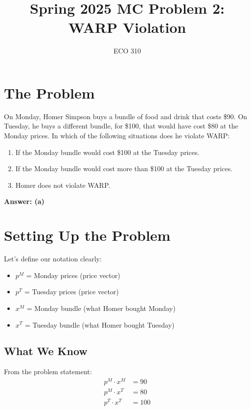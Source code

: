 \documentclass[11pt]{article}
\title{Spring 2025 MC Problem 2: WARP Violation}
\author{ECO 310}
\date{}
\begin{document}
\maketitle

\section{The Problem}

On Monday, Homer Simpson buys a bundle of food and drink that costs \$90. On Tuesday, he buys a different bundle, for \$100, that would have cost \$80 at the Monday prices. In which of the following situations does he violate WARP:

\begin{enumerate}
    \item[(a)] If the Monday bundle would cost \$100 at the Tuesday prices.
    \item[(b)] If the Monday bundle would cost more than \$100 at the Tuesday prices.
    \item[(c)] Homer does not violate WARP.
\end{enumerate}

\textbf{Answer: (a)}

\section{Setting Up the Problem}

Let's define our notation clearly:
\begin{itemize}
    \item $p^M$ = Monday prices (price vector)
    \item $p^T$ = Tuesday prices (price vector)
    \item $x^M$ = Monday bundle (what Homer bought Monday)
    \item $x^T$ = Tuesday bundle (what Homer bought Tuesday)
\end{itemize}

\subsection{What We Know}

From the problem statement:
\begin{align}
p^M \cdot x^M &= 90 \tag{Monday bundle cost on Monday} \\
p^M \cdot x^T &= 80 \tag{Tuesday bundle cost at Monday prices} \\
p^T \cdot x^T &= 100 \tag{Tuesday bundle cost on Tuesday}
\end{align}
\end{document}
